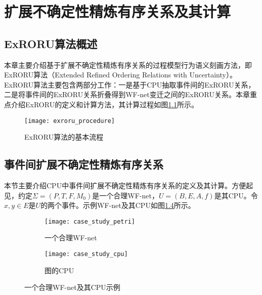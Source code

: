 \chapter{扩展不确定性精炼有序关系及其计算}\label{cha:exroru}
\section{ExRORU算法概述}\label{sec:exroru_intro}
本章主要介绍基于扩展不确定性精炼有序关系的过程模型行为语义刻画方法，即ExRORU算法（Extended Refined Ordering Relations with Uncertainty）。ExRORU算法主要包含两部分工作：一是基于CPU抽取事件间的ExRORU关系，二是将事件间的ExRORU关系折叠得到WF-net变迁之间的ExRORU关系。本章重点介绍ExRORU的定义和计算方法，其计算过程如图\ref{fig:exroru_procedure}所示。

\begin{figure}[htbp]
  \centering
  \texttt{[image: exroru\_procedure]}
  \caption{ExRORU算法的基本流程\label{fig:exroru_procedure}}
\end{figure}


\section{事件间扩展不确定性精炼有序关系}\label{sec:exroru_event}
本节主要介绍CPU中事件间扩展不确定性精炼有序关系的定义及其计算。方便起见，约定$\Sigma=(P,T,F,M_{0})$是一个合理WF-net，$U=(B,E,A,f)$是其CPU。令$x,y\in E$是$U$的两个事件。示例WF-net及其CPU如图\ref{fig:case_study}所示。

\begin{figure}[htbp]
  \centering
  \begin{subfigure}{1\textwidth}
  	\centering
  	\texttt{[image: case\_study\_petri]}
  	\caption{一个合理WF-net}
  	\label{fig:case_study_petri}
  \end{subfigure}
  \begin{subfigure}{1\textwidth}
  	\vspace{1em}
  	\centering
  	\texttt{[image: case\_study\_cpu]}
  	\caption{图的CPU}
  	\label{fig:case_study_cpu}
  \end{subfigure}
  \vspace{6pt}
  \caption{一个合理WF-net及其CPU示例}
  \label{fig:case_study}
\end{figure}

